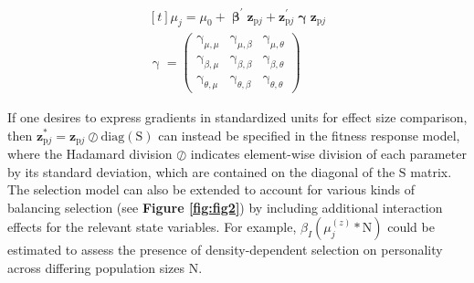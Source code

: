 \documentclass{article}
\begin{document}
\begin{equation} \tag{1.3}\label{eq:1.3}
\begin{gathered}[t]
\mu_{j} = \mu_0 + \boldsymbol{\upbeta}^{{\prime}}\boldsymbol{z}_{\boldsymbol{\mathrm{p}}j} + \boldsymbol{z}^{\prime}_{\boldsymbol{\mathrm{p}}j} \boldsymbol{\upgamma} \boldsymbol{z}_{\boldsymbol{\mathrm{p}}j} \\
\boldsymbol{\mathrm{\upgamma}} =
\begin{pmatrix}
\upgamma _{\mu,\mu} & 
\upgamma _{\mu,\beta} &
\upgamma _{\mu,\theta} \\
\upgamma _{\beta,\mu} & \upgamma _{\beta,\beta} & \upgamma _{\beta,\theta} \\
\upgamma _{\theta,\mu} & \upgamma _{\theta,\beta} & \upgamma _{\theta,\theta} 
\end{pmatrix} \nonumber
\end{gathered}
\end{equation}

If one desires to express gradients in standardized units for effect
size comparison, then
\(\boldsymbol{z}^*_{\boldsymbol{\mathrm{p}}j}=\boldsymbol{z}_{\boldsymbol{\mathrm{p}}j}\oslash \mathrm{diag}(\boldsymbol{\mathrm{S}})\)
can instead be specified in the fitness response model, where the
Hadamard division \(\oslash\) indicates element-wise division of each
parameter by its standard deviation, which are contained on the diagonal
of the \(\boldsymbol{\mathrm{S}}\) matrix. The selection model can also
be extended to account for various kinds of balancing selection (see
\textbf{Figure \ref{fig:fig2}}) by including additional interaction
effects for the relevant state variables. For example,
\(\beta_{I} ( \mu^{(z)}_{j} * \mathrm{N} )\) could be estimated to
assess the presence of density-dependent selection on personality across
differing population sizes \(\mathrm{N}\).
\end{document}
